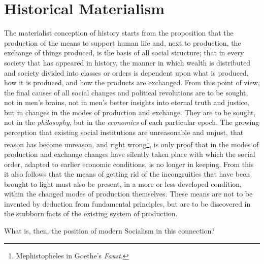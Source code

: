 \chapter{Historical Materialism}

The materialist conception of history starts from the proposition that the
production of the means to support human life and, next to production, the
exchange of things produced, is the basis of all social structure; that in every
society that has appeared in history, the manner in which wealth is distributed
and society divided into classes or orders is dependent upon what is produced,
how it is produced, and how the products are exchanged. From this point of
view, the final causes of all social changes and political revolutions are to be
sought, not in men's brains, not in men's better insights into eternal truth and
justice, but in changes in the modes of production and exchange. They are to be
sought, not in the \emph{philosophy}, but in the \emph{economics} of each
particular epoch. The growing perception that existing social institutions are
unreasonable and unjust, that reason has become unreason, and right
wrong\footnote{Mephistopheles in Goethe's \emph{Faust}.}, is only proof that in
the modes of production and exchange changes have silently taken place with
which the social order, adapted to earlier economic conditions, is no longer in
keeping. From this it also follows that the means of getting rid of the
incongruities that have been brought to light must also be present, in a more
or less developed condition, within the changed modes of production themselves.
These means are not to be invented by deduction from fundamental principles,
but are to be discovered in the stubborn facts of the existing system of
production.

What is, then, the position of modern Socialism in this connection?

